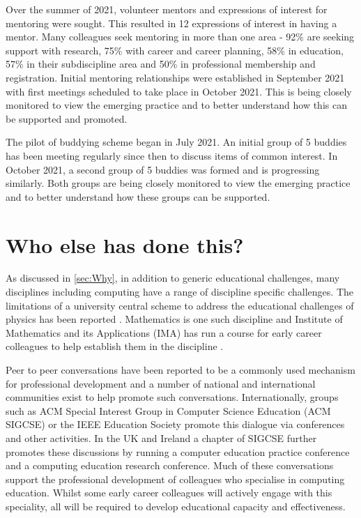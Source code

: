 \documentclass[sigconf]{acmart}
\begin{document}
Over the summer of 2021, volunteer mentors and expressions of interest for mentoring were sought. This resulted in 12 expressions of interest in having a mentor. Many colleagues seek mentoring in more than one area - 92\% are seeking support with research, 75\% with career and career planning, 58\% in education, 57\% in their subdiscipline area and 50\% in professional membership and registration. Initial mentoring relationships were established in September 2021 with first meetings scheduled to take place in October 2021. This is being closely monitored to view the emerging practice and to better understand how this can be supported and promoted.

\begin{comment}
To DO - evaluation of Buddying - PH what is needed here? Is sufficient to indicate the first pilot of 10 buddies has been established? Or do we need feedback from the participants?
\end{comment}

The pilot of buddying scheme began in July 2021. An initial group of 5 buddies has been meeting regularly since then to discuss items of common interest. In October 2021, a second group of 5 buddies was formed and is progressing similarly. Both groups are being closely monitored to view the emerging practice and to better understand how these groups can be supported.


\section{Who else has done this?}
As discussed in \ref{sec:Why}, in addition to generic educational challenges, many disciplines including computing have a range of discipline specific challenges. The limitations of a university central scheme to address the educational challenges of physics has been reported \cite{Magueijo2009}.  Mathematics is one such discipline and Institute of Mathematics and its Applications (IMA) has run a course for early career colleagues to help establish them in the discipline \cite{IMA}.  

Peer to peer conversations have been reported to be a commonly used mechanism for professional development \cite{King2004} and a number of national and international communities exist to help promote such conversations. Internationally, groups such as ACM Special Interest Group in Computer Science Education (ACM SIGCSE) or the IEEE Education Society promote this dialogue via conferences and other activities.  In the UK and Ireland a chapter of SIGCSE further promotes these discussions by running a computer education practice conference and a computing education research conference. Much of these conversations support the professional development of colleagues who specialise in computing education. Whilst some early career colleagues will actively engage with this speciality, all will be required to develop educational capacity and effectiveness.
 
\end{document}
